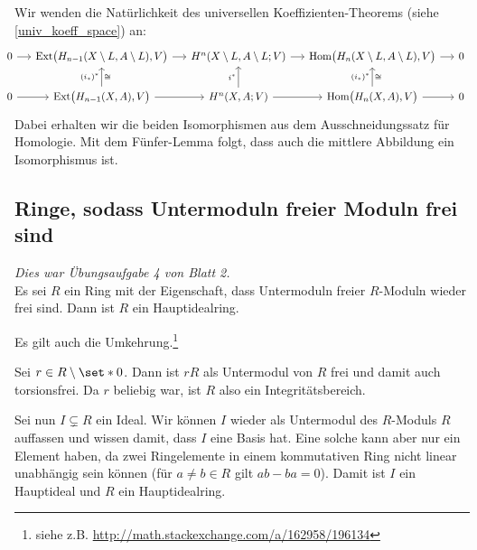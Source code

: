 \begin{beweis}[name={\cite[S. 199 ff]{Hatcher}}]
\begin{enumerate}[(i)]
		Wir wenden die Natürlichkeit des universellen Koeffizienten-Theorems (siehe \autoref{univ_koeff_space}) an:
		\[
			\hspace{-1.2em}\begin{tikzcd}[column sep=1.3em]
				0 \rar & \Ext \enbrace[\big]{H_{n-1}(X\setminus L,A \setminus L),V} \rar & H^n(X\setminus L,A \setminus L;V) \rar & \Hom \enbrace[\big]{H_n(X \setminus L,A\setminus L),V} \rar & 0 \\
				0 \rar & \Ext \enbrace[\big]{H_{n-1}(X,A),V} \rar \uar["(i_*)^*","\cong"'] & H^n(X,A;V) \uar["i^*"] \rar & \Hom \enbrace[\big]{H_n(X,A),V} \rar \uar["(i_*)^*","\cong"'] & 0 
			\end{tikzcd}
		\]
		Dabei erhalten wir die beiden Isomorphismen aus dem Ausschneidungssatz für Homologie.
		Mit dem Fünfer-Lemma folgt, dass auch die mittlere Abbildung ein Isomorphismus ist.\qedhere
	\end{enumerate}
\end{beweis}

\subsection{Ringe, sodass Untermoduln freier Moduln frei sind} %
\label{sub:untermod_frei}
\emph{Dies war Übungsaufgabe 4 von Blatt 2.}\smallskip\\
Es sei $R$ ein Ring mit der Eigenschaft, dass Untermoduln freier $R$-Moduln wieder frei sind.
Dann ist $R$ ein Hauptidealring.

Es gilt auch die Umkehrung.\footnote{siehe z.B. \url{http://math.stackexchange.com/a/162958/196134}}
\begin{beweis}
	Sei $r \in R \setminus \set*{0}$.
	Dann ist $r R$ als Untermodul von $R$ frei und damit auch torsionsfrei.
	Da $r$ beliebig war, ist $R$ also ein Integritätsbereich.
	
	Sei nun $I \subsetneq R$ ein Ideal.
	Wir können $I$ wieder als Untermodul des $R$-Moduls $R$ auffassen und wissen damit, dass $I$ eine Basis hat.
	Eine solche kann aber nur ein Element haben, da zwei Ringelemente in einem kommutativen Ring nicht linear unabhängig sein können (für $a \neq b \in R$ gilt $ab -ba=0$).
	Damit ist $I$ ein Hauptideal und $R$ ein Hauptidealring.
\end{beweis}


